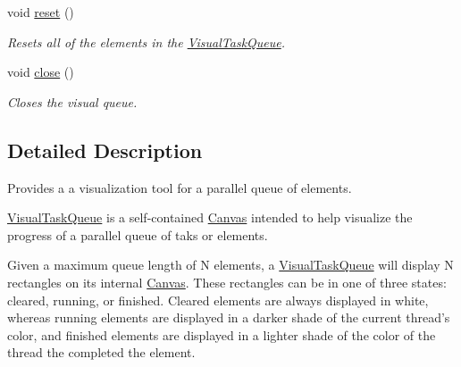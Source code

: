 \begin{DoxyCompactItemize}
void \hyperlink{classtsgl_1_1_visual_task_queue_a1cd23a5361c0209ac950db6afcd68a19}{reset} ()
\begin{DoxyCompactList}\small\item\em Resets all of the elements in the \hyperlink{classtsgl_1_1_visual_task_queue}{Visual\-Task\-Queue}. \end{DoxyCompactList}\item 
void \hyperlink{classtsgl_1_1_visual_task_queue_a7340d211424a9f947152fed22cce4d79}{close} ()
\begin{DoxyCompactList}\small\item\em Closes the visual queue. \end{DoxyCompactList}\end{DoxyCompactItemize}


\subsection{Detailed Description}
Provides a a visualization tool for a parallel queue of elements. 

\hyperlink{classtsgl_1_1_visual_task_queue}{Visual\-Task\-Queue} is a self-\/contained \hyperlink{classtsgl_1_1_canvas}{Canvas} intended to help visualize the progress of a parallel queue of taks or elements.

Given a maximum queue length of {\ttfamily N} elements, a \hyperlink{classtsgl_1_1_visual_task_queue}{Visual\-Task\-Queue} will display {\ttfamily N} rectangles on its internal \hyperlink{classtsgl_1_1_canvas}{Canvas}. These rectangles can be in one of three states\-: cleared, running, or finished. Cleared elements are always displayed in white, whereas running elements are displayed in a darker shade of the current thread's color, and finished elements are displayed in a lighter shade of the color of the thread the completed the element. 

